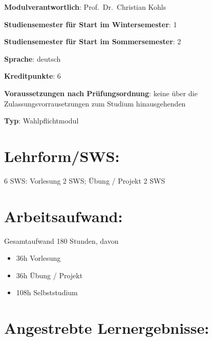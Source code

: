 \begin{modulHead}
\textbf{Modulverantwortlich}: Prof.~Dr.~Christian
Kohls
\end{modulHead}
\begin{modulHead}
\textbf{Studiensemester für
Start im Wintersemester}:
1
\end{modulHead}
\begin{modulHead}
\textbf{Studiensemester für Start
im Sommersemester}:
2
\end{modulHead}
\begin{modulHead}
\textbf{Sprache}:
deutsch
\end{modulHead}
\begin{modulHead}
\textbf{Kreditpunkte}:
6
\end{modulHead}
\begin{modulHead}
\textbf{Voraussetzungen nach
Prüfungsordnung}: keine über die Zulassungsvorrausetzungen zum Studium
hinausgehenden
\end{modulHead}
\begin{modulHead}
\textbf{Typ}:
Wahlpflichtmodul
\end{modulHead}


\section*{Lehrform/SWS:\label{/mi-2017/modulbeschreibungen-master/MA_SC_WPF_CSCL}}\label{lehrformswspathlabelmi-2017modulbeschreibungen-mastermaux5fscux5fwpfux5fcscl}

6 SWS: Vorlesung 2 SWS; Übung / Projekt 2 SWS

\section*{Arbeitsaufwand:\label{/mi-2017/modulbeschreibungen-master/MA_SC_WPF_CSCL}}\label{arbeitsaufwandpathlabelmi-2017modulbeschreibungen-mastermaux5fscux5fwpfux5fcscl}

Gesamtaufwand 180 Stunden, davon

\begin{itemize}
\tightlist
\item
  36h Vorlesung
\item
  36h Übung / Projekt
\item
  108h Selbststudium
\end{itemize}

\section*{Angestrebte
Lernergebnisse:\label{/mi-2017/modulbeschreibungen-master/MA_SC_WPF_CSCL}}\label{angestrebte-lernergebnissepathlabelmi-2017modulbeschreibungen-mastermaux5fscux5fwpfux5fcscl}

